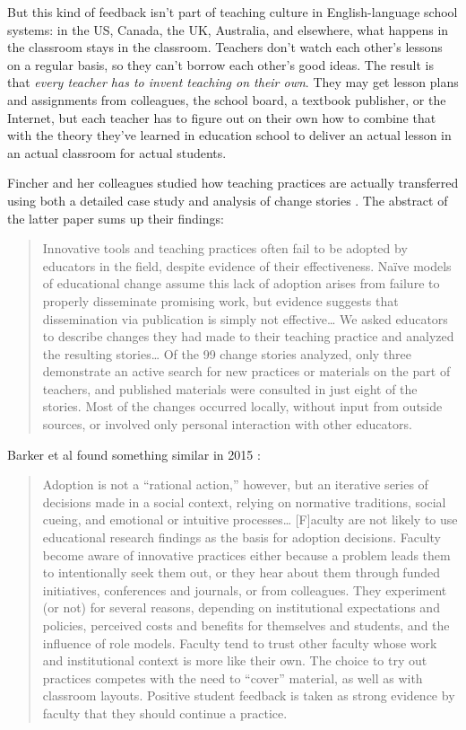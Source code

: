 But this kind of feedback isn't part of teaching culture in
English-language school systems: in the US, Canada, the UK, Australia,
and elsewhere, what happens in the classroom stays in the classroom.
Teachers don't watch each other's lessons on a regular basis, so they
can't borrow each other's good ideas. The result is that \emph{every
teacher has to invent teaching on their own}. They may get lesson plans
and assignments from colleagues, the school board, a textbook publisher,
or the Internet, but each teacher has to figure out on their own how to
combine that with the theory they've learned in education school to
deliver an actual lesson in an actual classroom for actual students.

Fincher and her colleagues studied how teaching practices are actually
transferred using both a detailed case study \cite{bib:fincher-warrens-questions}
and analysis of change stories \cite{bib:fincher-stories-change}.
The abstract of the latter paper sums up their findings:

\begin{quote}
Innovative tools and teaching practices often fail to be adopted by
educators in the field, despite evidence of their effectiveness. Naïve
models of educational change assume this lack of adoption arises from
failure to properly disseminate promising work, but evidence suggests
that dissemination via publication is simply not effective\ldots{} We
asked educators to describe changes they had made to their teaching
practice and analyzed the resulting stories\ldots{} Of the 99 change
stories analyzed, only three demonstrate an active search for new
practices or materials on the part of teachers, and published materials
were consulted in just eight of the stories. Most of the changes
occurred locally, without input from outside sources, or involved only
personal interaction with other educators.
\end{quote}

Barker et al found something similar in 2015 \cite{bib:barker-practice-adoption}:

\begin{quote}
Adoption is not a ``rational action,'' however, but an iterative series
of decisions made in a social context, relying on normative traditions,
social cueing, and emotional or intuitive processes\ldots{}
{[}F{]}aculty are not likely to use educational research findings as the
basis for adoption decisions. Faculty become aware of innovative
practices either because a problem leads them to intentionally seek them
out, or they hear about them through funded initiatives, conferences and
journals, or from colleagues. They experiment (or not) for several
reasons, depending on institutional expectations and policies, perceived
costs and benefits for themselves and students, and the influence of
role models. Faculty tend to trust other faculty whose work and
institutional context is more like their own. The choice to try out
practices competes with the need to ``cover'' material, as well as with
classroom layouts. Positive student feedback is taken as strong evidence
by faculty that they should continue a practice.
\end{quote}

